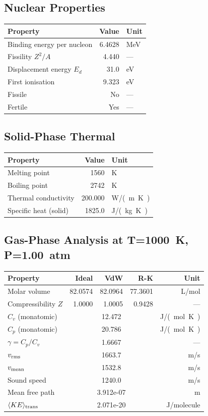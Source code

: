 \documentclass[11pt,a4paper]{article}
\begin{document}
\subsection{Nuclear Properties}
\begin{tabular}{lrl}
  \toprule
  Property & Value & Unit \\
  \midrule
  Binding energy per nucleon & 6.4628 & \si{MeV} \\
  Fissility $Z^2/A$ & 4.440 & --- \\
  Displacement energy $E_d$ & 31.0 & \si{eV} \\
  First ionisation & 9.323 & \si{eV} \\
  Fissile & No & --- \\
  Fertile & Yes & --- \\
  \bottomrule
\end{tabular}

\subsection{Solid-Phase Thermal}
\begin{tabular}{lrl}
  \toprule
  Property & Value & Unit \\
  \midrule
  Melting point & 1560 & \si{K} \\
  Boiling point & 2742 & \si{K} \\
  Thermal conductivity & 200.000 & \si{W/(m.K)} \\
  Specific heat (solid) & 1825.0 & \si{J/(kg.K)} \\
  \bottomrule
\end{tabular}

\subsection{Gas-Phase Analysis at T=\SI{1000}{K}, P=\SI{1.00}{atm}}
\begin{tabular}{lrrrr}
  \toprule
  Property & Ideal & VdW & R-K & Unit \\
  \midrule
  Molar volume & 82.0574 & 82.0964 & 77.3601 & \si{L/mol} \\
  Compressibility $Z$ & 1.0000 & 1.0005 & 0.9428 & --- \\
  \midrule
  $C_v$ (monatomic) & \multicolumn{3}{c}{12.472} & \si{J/(mol.K)} \\
  $C_p$ (monatomic) & \multicolumn{3}{c}{20.786} & \si{J/(mol.K)} \\
  $\gamma = C_p/C_v$ & \multicolumn{3}{c}{1.6667} & --- \\
  $v_{\rm rms}$ & \multicolumn{3}{c}{1663.7} & \si{m/s} \\
  $v_{\rm mean}$ & \multicolumn{3}{c}{1532.8} & \si{m/s} \\
  Sound speed & \multicolumn{3}{c}{1240.0} & \si{m/s} \\
  Mean free path & \multicolumn{3}{c}{3.912e-07} & \si{m} \\
  $\langle KE \rangle_{\rm trans}$ & \multicolumn{3}{c}{2.071e-20} & \si{J/molecule} \\
  \bottomrule
\end{tabular}
\end{document}
